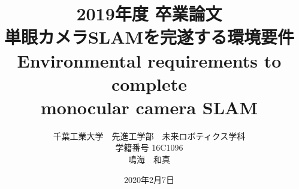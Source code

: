 \documentclass[a4paper,11pt]{jsbook}
\begin{document}
\title{2019年度 卒業論文\\
単眼カメラSLAMを完遂する環境要件\\
Environmental requirements to complete\\
 monocular camera SLAM }

\author{千葉工業大学　先進工学部　未来ロボティクス学科\\
学籍番号 16C1096\\
鳴海　和真}




\date{2020年2月7日}

\maketitle

\clearpage



\tableofcontents



\cleardoublepage
{}


%





\appendix





\newpage
\printindex
\end{document}
